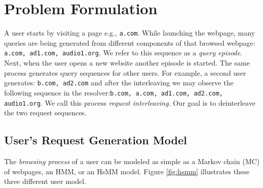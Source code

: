 	\section{Problem Formulation}
	\label{sec:gen}
        \label{subsec:nature}

	


	A user starts by visiting a page e.g., {\tt a.com}. While
        launching the webpage, many queries are being generated from
        different components of that browsed webpage: {\tt a.com, ad1.com,
        audio1.org}.  We refer to this sequence as a {\em query episode}.
        Next, when the user opens a new website another episode 
        is started.  The same process generates query
        sequences for other users.  For example, a second user generates: 
        {\tt b.com, ad2.com} and after the interleaving we may observe the
        following sequence in the resolver:{\tt  b.com, a.com, ad1.com,
        ad2.com, audio1.org}.
	We call this process \emph{request interleaving}.
	Our goal is to deinterleave the two request sequences. 
	
	\subsection{User's Request Generation Model}
	\label{subsec:user}
	The \emph{browsing process} of a user can be modeled as simple
        as a Markov chain (MC) of webpages, an HMM, or an HsMM model.
        Figure \ref{fig:hsmm} illustrates these three different user
        model.
	
